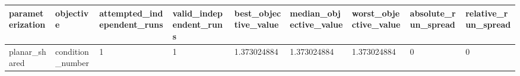 \begin{tabular}{@{}lllllllll@{}}
\toprule
parameterization & objective & attempted\_independent\_runs & valid\_independent\_runs & best\_objective\_value & median\_objective\_value & worst\_objective\_value & absolute\_run\_spread & relative\_run\_spread \\
\midrule
planar\_shared & condition\_number & 1 & 1 & 1.373024884 & 1.373024884 & 1.373024884 & 0 & 0 \\
\bottomrule
\end{tabular}
